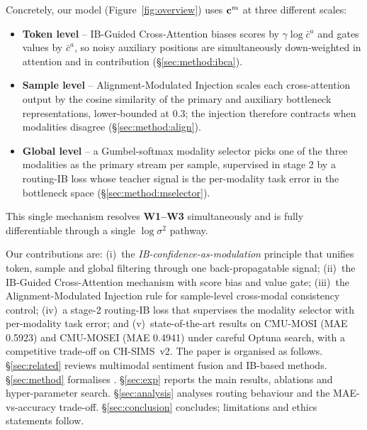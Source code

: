 Concretely, our model \methodname{} (Figure~\ref{fig:overview}) uses
$\mathbf{c}^{m}$ at three different scales:
\begin{itemize}
\itemsep0.1em
\item \textbf{Token level} -- IB-Guided Cross-Attention biases scores
  by $\gamma\log\bar c^{a}$ and gates values by $\bar c^{a}$, so noisy
  auxiliary positions are simultaneously down-weighted in attention and
  in contribution (\S\ref{sec:method:ibca}).
\item \textbf{Sample level} -- Alignment-Modulated Injection scales
  each cross-attention output by the cosine similarity of the primary
  and auxiliary bottleneck representations, lower-bounded at $0.3$;
  the injection therefore contracts when modalities disagree
  (\S\ref{sec:method:align}).
\item \textbf{Global level} -- a Gumbel-softmax modality selector
  picks one of the three modalities as the primary stream per sample,
  supervised in stage 2 by a routing-IB loss whose teacher signal is
  the per-modality task error in the bottleneck space
  (\S\ref{sec:method:mselector}).
\end{itemize}
This single mechanism resolves \textbf{W1--W3} simultaneously and is
fully differentiable through a single $\log\sigma^{2}$ pathway.

Our contributions are: (i)~the \emph{IB-confidence-as-modulation}
principle that unifies token, sample and global filtering through one
back-propagatable signal; (ii)~the IB-Guided Cross-Attention
mechanism with score bias and value gate; (iii)~the
Alignment-Modulated Injection rule for sample-level cross-modal
consistency control; (iv)~a stage-2 routing-IB loss that supervises
the modality selector with per-modality task error; and
(v)~state-of-the-art results on \textsc{CMU-MOSI} (MAE 0.5923) and
\textsc{CMU-MOSEI} (MAE 0.4941) under careful Optuna search, with a
competitive trade-off on \textsc{CH-SIMS}~v2.
The paper is organised as follows.
\S\ref{sec:related} reviews multimodal sentiment fusion and IB-based
methods.
\S\ref{sec:method} formalises \methodname{}.
\S\ref{sec:exp} reports the main results, ablations and
hyper-parameter search.
\S\ref{sec:analysis} analyses routing behaviour and the
MAE-vs-accuracy trade-off.
\S\ref{sec:conclusion} concludes; limitations and ethics statements
follow.
